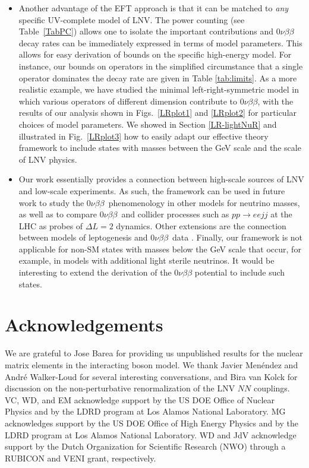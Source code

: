\documentclass[letterpaper,11pt]{article}
\newcommand{\NLDBD}{$0 \nu \beta \beta$}
\begin{document}
\begin{itemize}
\item Another advantage of the EFT approach is that it can be matched to \textit{any} specific UV-complete model of LNV. 
The power counting (see Table~\ref{TabPC}) allows one to isolate the important contributions and $0\nu\beta\beta$ decay rates can be immediately expressed in terms of model parameters. 
This allows for easy derivation of bounds on the specific high-energy model. 
For instance, our bounds on operators in the simplified circumstance that a single operator dominates the decay rate are given in Table \ref{tab:limits}.
As a more  realistic example, we have studied the minimal left-right-symmetric model in which various operators of different dimension 
contribute to $0\nu\beta\beta$, with the results of our analysis shown in Figs.\ \ref{LRplot1} and \ref{LRplot2}  for particular choices of model parameters.
We showed in Section \ref{LR-lightNuR} and illustrated in Fig.\ \ref{LRplot3} how to easily adapt our effective theory framework to 
include states with masses between the GeV scale and the scale of LNV physics.


\item Our work essentially provides a connection between high-scale sources of LNV and low-scale experiments. As such, the framework can be used in future work to study the \NLDBD\  phenomenology in  other models for neutrino masses,  
as well as to compare \NLDBD\  and  collider processes such as $pp \to ee jj$  at the LHC as probes of $\Delta L = 2$ dynamics. Other extensions are the connection between models of leptogenesis and  \NLDBD\  data \cite{Deppisch:2017ecm}. Finally, our framework is not applicable for non-SM states with masses below the GeV scale that occur, for example, in models with additional light sterile neutrinos. It would be interesting to extend the derivation of the $0\nu\beta\beta$ potential to include such states. 

 
\end{itemize}



\section*{Acknowledgements}
We are grateful to  Jose Barea for providing us unpublished results for the nuclear matrix elements in the interacting
boson model. We thank Javier Men\'endez and Andr\'e Walker-Loud for several interesting conversations, and Bira van Kolck for discussion on the non-perturbative renormalization of the 
LNV $NN$ couplings. 
VC, WD,  and EM  acknowledge support by the US DOE Office of Nuclear Physics and by the LDRD program at Los Alamos National Laboratory.
MG acknowledges support by the US DOE Office of High Energy Physics and by the LDRD program at Los Alamos National Laboratory.
WD and JdV  acknowledge  support by the Dutch Organization for Scientific Research (NWO) 
through a RUBICON  and VENI grant, respectively.
\end{document}
